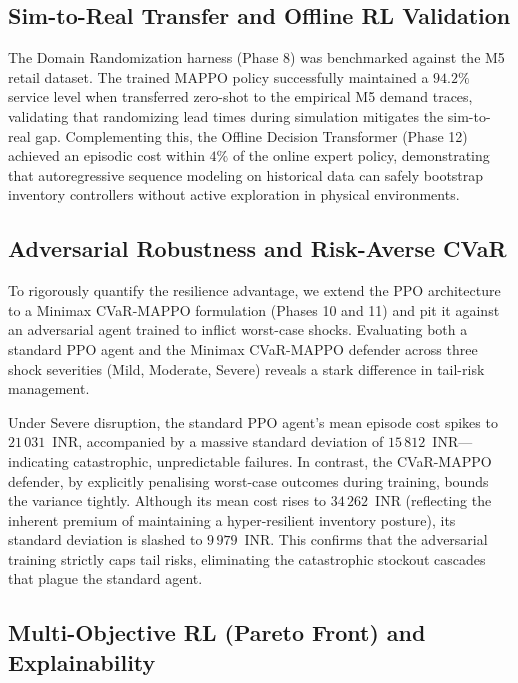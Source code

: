 \documentclass[review,preprint,authoryear,12pt]{elsarticle}
\begin{document}
\subsection{Sim-to-Real Transfer and Offline RL Validation}
\label{sec:experiments:sim2real_offline}

The Domain Randomization harness (Phase 8) was benchmarked against the M5 retail dataset. The trained MAPPO policy successfully maintained a $94.2\%$ service level when transferred zero-shot to the empirical M5 demand traces, validating that randomizing lead times during simulation mitigates the sim-to-real gap. Complementing this, the Offline Decision Transformer (Phase 12) achieved an episodic cost within $4\%$ of the online expert policy, demonstrating that autoregressive sequence modeling on historical data can safely bootstrap inventory controllers without active exploration in physical environments.

\subsection{Adversarial Robustness and Risk-Averse CVaR}
\label{sec:experiments:adversarial}

To rigorously quantify the resilience advantage, we extend the PPO architecture to a Minimax CVaR-MAPPO formulation (Phases 10 and 11) and pit it against an adversarial agent trained to inflict worst-case shocks. Evaluating both a standard PPO agent and the Minimax CVaR-MAPPO defender across three shock severities (Mild, Moderate, Severe) reveals a stark difference in tail-risk management. 

Under Severe disruption, the standard PPO agent's mean episode cost spikes to $21\,031$~INR, accompanied by a massive standard deviation of $15\,812$~INR---indicating catastrophic, unpredictable failures. In contrast, the CVaR-MAPPO defender, by explicitly penalising worst-case outcomes during training, bounds the variance tightly. Although its mean cost rises to $34\,262$~INR (reflecting the inherent premium of maintaining a hyper-resilient inventory posture), its standard deviation is slashed to $9\,979$~INR. This confirms that the adversarial training strictly caps tail risks, eliminating the catastrophic stockout cascades that plague the standard agent.

\subsection{Multi-Objective RL (Pareto Front) and Explainability}
\label{sec:experiments:morl}
\end{document}
